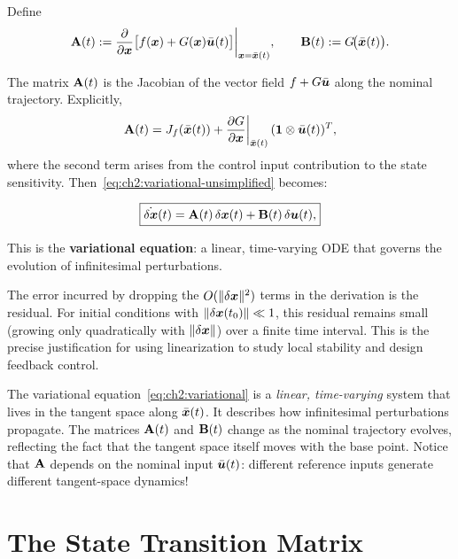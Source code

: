 Define
\begin{equation}
\mathbf{A}(t) := \frac{\partial}{\partial \bm{x}}\bigl[f(\bm{x})+G(\bm{x})\bar{\bm{u}}(t)\bigr]\bigg|_{\bm{x}=\bar{\bm{x}}(t)},
\qquad
\mathbf{B}(t) := G\!\bigl(\bar{\bm{x}}(t)\bigr).
\label{eq:ch2:AB-def}
\end{equation}

The matrix $\mathbf{A}(t)$ is the Jacobian of the vector field $f + G\bar{\bm{u}}$ along the
nominal trajectory. Explicitly,
\begin{equation}
\mathbf{A}(t) = J_f(\bar{\bm{x}}(t)) + \frac{\partial G}{\partial\bm{x}}\bigg|_{\bar{\bm{x}}(t)} \, (\mathbf{1} \otimes \bar{\bm{u}}(t))^T,
\end{equation}
where the second term arises from the control input contribution to the state sensitivity.
Then~\eqref{eq:ch2:variational-unsimplified} becomes:

\begin{equation}
\boxed{
\dot{\delta\bm{x}}(t) = \mathbf{A}(t)\,\delta\bm{x}(t) + \mathbf{B}(t)\,\delta\bm{u}(t),
}
\label{eq:ch2:variational}
\end{equation}

This is the \textbf{variational equation}: a linear, time-varying ODE that governs the
evolution of infinitesimal perturbations.

\begin{designbox}
The error incurred by dropping the $O(\|\delta\bm{x}\|^2)$ terms in the derivation is the residual.
For initial conditions with $\|\delta\bm{x}(t_0)\| \ll 1$, this residual remains small (growing only
quadratically with $\|\delta\bm{x}\|$) over a finite time interval. This is the precise justification
for using linearization to study local stability and design feedback control.
\end{designbox}

\begin{intuitionbox}
The variational equation~\eqref{eq:ch2:variational} is a \emph{linear, time-varying}
system that lives in the tangent space along $\bar{\bm{x}}(t)$. It describes how infinitesimal
perturbations propagate. The matrices $\mathbf{A}(t)$ and $\mathbf{B}(t)$ change as the
nominal trajectory evolves, reflecting the fact that the tangent space itself moves with
the base point. Notice that $\mathbf{A}$ depends on the nominal input $\bar{\bm{u}}(t)$: different
reference inputs generate different tangent-space dynamics!
\end{intuitionbox}


\section{The State Transition Matrix}


